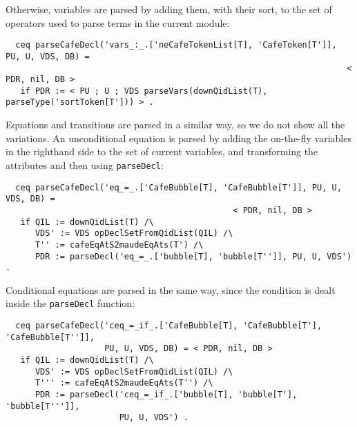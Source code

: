 Otherwise, variables are parsed by adding them, with their sort, to the set of operators
used to parse terms in the current module:

{\codesize
\begin{verbatim}
  ceq parseCafeDecl('vars_:_.['neCafeTokenList[T], 'CafeToken[T']], PU, U, VDS, DB) =
                                                                     < PDR, nil, DB >
   if PDR := < PU ; U ; VDS parseVars(downQidList(T), parseType('sortToken[T'])) > .
\end{verbatim}
}

Equations and transitions are parsed in a similar way, so we do not show all
the variations. An unconditional equation is parsed by adding the on-the-fly
variables in the righthand side to the set of current variables, and transforming
the attributes and then using \verb"parseDecl":

{\codesize
\begin{verbatim}
  ceq parseCafeDecl('eq_=_.['CafeBubble[T], 'CafeBubble[T']], PU, U, VDS, DB) =
                                              < PDR, nil, DB >
   if QIL := downQidList(T) /\
      VDS' := VDS opDeclSetFromQidList(QIL) /\
      T'' := cafeEqAtS2maudeEqAts(T') /\
      PDR := parseDecl('eq_=_.['bubble[T], 'bubble[T'']], PU, U, VDS') .
\end{verbatim}
}

{\codesize
\begin{comment}
  ceq parseCafeDecl('beq_=_.['CafeBubble[T], 'CafeBubble[T']], PU, U, VDS, DB) =
                                              < PDR, nil, DB >
   if QIL := downQidList(T) /\
      VDS' := VDS opDeclSetFromQidList(QIL) /\
      T'' := cafeEqAtS2maudeEqAts(T') /\
      PDR := parseDecl('eq_=_.['bubble[T], 'bubble[T'']], PU, U, VDS') .
\end{comment}
}

Conditional equations are parsed in the same way, since the condition is dealt inside
the \verb"parseDecl" function:

{\codesize
\begin{verbatim}
  ceq parseCafeDecl('ceq_=_if_.['CafeBubble[T], 'CafeBubble[T'], 'CafeBubble[T'']],
                    PU, U, VDS, DB) = < PDR, nil, DB >
   if QIL := downQidList(T) /\
      VDS' := VDS opDeclSetFromQidList(QIL) /\
      T''' := cafeEqAtS2maudeEqAts(T'') /\
      PDR := parseDecl('ceq_=_if_.['bubble[T], 'bubble[T'], 'bubble[T''']],
                       PU, U, VDS') .
\end{verbatim}
}

